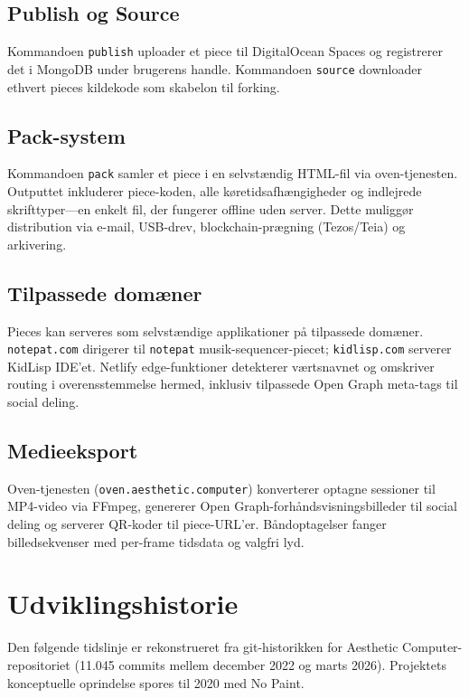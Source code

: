 \documentclass[10pt,letterpaper,twocolumn]{article}
\begin{document}
\subsection{Publish og Source}

Kommandoen \texttt{publish} uploader et piece til DigitalOcean Spaces og registrerer det i MongoDB under brugerens handle. Kommandoen \texttt{source} downloader ethvert pieces kildekode som skabelon til forking.

\subsection{Pack-system}

Kommandoen \texttt{pack} samler et piece i en selvstændig HTML-fil via oven-tjenesten. Outputtet inkluderer piece-koden, alle køretidsafhængigheder og indlejrede skrifttyper---en enkelt fil, der fungerer offline uden server. Dette muliggør distribution via e-mail, USB-drev, blockchain-prægning (Tezos/Teia) og arkivering.

\subsection{Tilpassede domæner}

Pieces kan serveres som selvstændige applikationer på tilpassede domæner. \texttt{notepat.com} dirigerer til \texttt{notepat} musik-sequencer-piecet; \texttt{kidlisp.com} serverer KidLisp IDE'et. Netlify edge-funktioner detekterer værtsnavnet og omskriver routing i overensstemmelse hermed, inklusiv tilpassede Open Graph meta-tags til social deling.

\subsection{Medieeksport}

Oven-tjenesten (\texttt{oven.aesthetic.computer}) konverterer optagne sessioner til MP4-video via FFmpeg, genererer Open Graph-forhåndsvisningsbilleder til social deling og serverer QR-koder til piece-URL'er. Båndoptagelser fanger billedsekvenser med per-frame tidsdata og valgfri lyd.


\section{Udviklingshistorie}
\label{sec:history}

Den følgende tidslinje er rekonstrueret fra git-historikken for Aesthetic Computer-repositoriet (11.045 commits mellem december 2022 og marts 2026). Projektets konceptuelle oprindelse spores til 2020 med No Paint.
\end{document}
